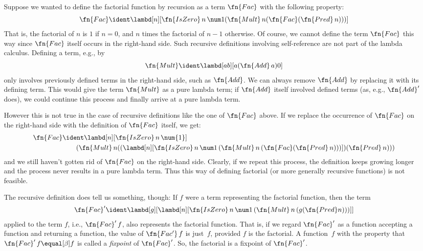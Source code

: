 \documentclass[../../../include/open-logic-section]{subfiles}
\begin{document}

Suppose we wanted to define the factorial function by recursion as a
term $\fn{Fac}$ with the following property:
\[
\fn{Fac} \ident \lambd[n][\fn{IsZero}\, n\, \num 1 (\fn{Mult}\, n (\fn{Fac}(\fn{Pred} \, n)))]
\]
That is, the factorial of $n$ is $1$ if $n = 0$, and $n$ times the
factorial of $n-1$ otherwise.  Of course, we cannot define the term
$\fn{Fac}$ this way since $\fn{Fac}$ itself occurs in the right-hand
side. Such recursive definitions involving self-reference
are not part of the lambda calculus. Defining a term, e.g., by
\[
\fn{Mult} \ident \lambd[ab][a (\fn{Add}\, a) 0]
\]
only involves previously defined terms in the right-hand side, such as
$\fn{Add}$. We can always remove $\fn{Add}$ by replacing it with its
defining term.  This would give the term $\fn{Mult}$ as a pure lambda
term; if $\fn{Add}$ itself involved defined terms (as, e.g.,
$\fn{Add}'$ does), we could continue this process and finally arrive at
a pure lambda term.

However this is not true in the case of recursive definitions like the
one of $\fn{Fac}$ above. If we replace the occurrence of $\fn{Fac}$ on
the right-hand side with the definition of $\fn{Fac}$ itself, we get:
\begin{align*}
  \fn{Fac} & \ident \lambd[n][\fn{IsZero}\, n\, \num{1}] \\
    & \qquad (\fn{Mult}\, n
  ((\lambd[n][\fn{IsZero} \, n \, \num 1\, (\fn{Mult}\, n\, (\fn{Fac}
    (\fn{Pred}\, n)))]) (\fn{Pred}\, n)))
\end{align*}
and we still haven't gotten rid of $\fn{Fac}$ on the right-hand
side. Clearly, if we repeat this process, the definition keeps growing
longer and the process never results in a pure lambda term. Thus this
way of defining factorial (or more generally recursive functions)
is not feasible.

The recursive definition does tell us something, though: If $f$ were a
term representing the factorial function, then the term
\[
\fn{Fac}' \ident \lambd[g][\lambd[n][\fn{IsZero} \, n \, \num 1\, (\fn{Mult} \, n\, (g (\fn{Pred} n)))]]
\]
applied to the term $f$, i.e., $\fn{Fac}'\,f$, also represents the
factorial function.  That is, if we regard $\fn{Fac}'$ as a function
accepting a function and returning a function, the value of
$\fn{Fac'}\, f$ is just~$f$, provided $f$ is the factorial. A
function~$f$ with the property that $\fn{Fac}' \, f \equal[\beta] f$ is called
a \emph{fixpoint} of $\fn{Fac}'$. So, the factorial is a fixpoint of
$\fn{Fac}'$.
\end{document}
